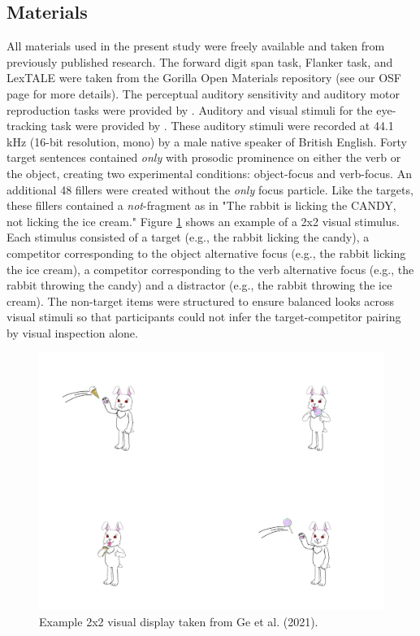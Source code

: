 \subsection{Materials}
All materials used in the present study were freely available and taken from previously published research. The forward digit span task, Flanker task, and LexTALE \citep{lemhofer2012introducing} were taken from the Gorilla \citep{Anwyl-Irvine_2019} Open Materials repository (see our OSF page for more details). The perceptual auditory sensitivity and auditory motor reproduction tasks were provided by \cite{Kachlicka_Saito_Tierney_2019, saito2020domain}. Auditory and visual stimuli for the eye-tracking task were provided by \cite{Ge2021}. These auditory stimuli were recorded at 44.1 kHz (16-bit resolution, mono) by a male native speaker of British English. Forty target sentences contained \textit{only} with prosodic prominence on either the verb or the object, creating two experimental conditions: object-focus and verb-focus. An additional 48 fillers were created without the \textit{only} focus particle. Like the targets, these fillers contained a \textit{not}-fragment as in "The rabbit is licking the CANDY, not licking the ice cream." Figure \ref{fig:sampleslide} shows an example of a 2x2 visual stimulus. Each stimulus consisted of a target (e.g., the rabbit licking the candy), a competitor corresponding to the object alternative focus (e.g., the rabbit licking the ice cream), a competitor corresponding to the verb alternative focus (e.g., the rabbit throwing the candy) and a distractor (e.g., the rabbit throwing the ice cream). The non-target items were structured to ensure balanced looks across visual stimuli so that participants could not infer the target-competitor pairing by visual inspection alone.

\begin{figure}
    \centering
    \includegraphics[width=\textwidth,height=\textheight,keepaspectratio]{viz/Fig1-Geetal.jpg}
    \caption{Example 2x2 visual display taken from Ge et al. (2021).}
    \label{fig:sampleslide}
\end{figure}


